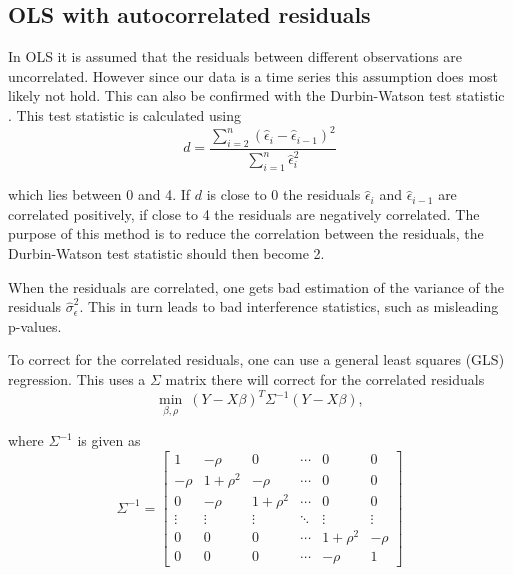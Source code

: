 
\subsection{OLS with autocorrelated residuals}

In OLS it is assumed that the residuals between different observations are uncorrelated. However since our data is a time series this assumption does most likely not hold. This can also be confirmed with the Durbin-Watson test statistic \cite[p.~173]{autocorrelation-kousgaard}. This test statistic is calculated using
\begin{equation}
d = \frac{\sum_{i=2}^n \left( \hat{\epsilon}_i - \hat{\epsilon}_{i-1} \right)^2}{ \sum_{i=1}^n\hat{\epsilon}_i^2 }
\end{equation}

which lies between 0 and 4. If $d$ is close to 0 the residuals $\hat{\epsilon}_i$ and $\hat{\epsilon}_{i-1}$ are correlated positively, if close to 4 the residuals are negatively correlated. The purpose of this method is to reduce the correlation between the residuals, the Durbin-Watson test statistic should then become 2.

When the residuals are correlated, one gets bad estimation of the variance of the residuals $\hat{\sigma}_\epsilon^2$. This in turn leads to bad interference statistics, such as misleading p-values.

To correct for the correlated residuals, one can use a general least squares (GLS) regression. This uses a $\Sigma$ matrix there will correct for the correlated residuals
\begin{equation}
\min_{\beta, \rho}\ (Y-X\beta)^T \Sigma^{-1}(Y-X\beta),
\label{eq:theory-olsar-min}
\end{equation}

where $ \Sigma^{-1}$ is given as
\begin{equation}
\Sigma^{-1}  = \begin{bmatrix}
1         & -\rho         & 0               & \cdots & 0              & 0         \\
-\rho   & 1+\rho^2 & -\rho         & \cdots & 0               & 0         \\
0         & -\rho         & 1+\rho^2 & \cdots &0                & 0         \\
\vdots & \vdots      & \vdots       & \ddots & \vdots      & \vdots \\
0         & 0               &0                & \cdots & 1+\rho^2 & -\rho    \\
0         & 0               &0                & \cdots &-\rho          & 1
\end{bmatrix}
\end{equation}

